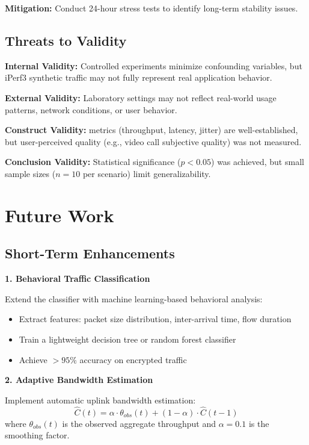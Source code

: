 \textbf{Mitigation:} Conduct 24-hour stress tests to identify long-term stability issues.

\subsection{Threats to Validity}

\textbf{Internal Validity:} Controlled experiments minimize confounding variables, but iPerf3 synthetic traffic may not fully represent real application behavior.

\textbf{External Validity:} Laboratory settings may not reflect real-world usage patterns, network conditions, or user behavior.

\textbf{Construct Validity:} \qos metrics (throughput, latency, jitter) are well-established, but user-perceived quality (e.g., video call subjective quality) was not measured.

\textbf{Conclusion Validity:} Statistical significance ($p < 0.05$) was achieved, but small sample sizes ($n=10$ per scenario) limit generalizability.

\section{Future Work}
\label{sec:future-work}

\subsection{Short-Term Enhancements}

\textbf{1. Behavioral Traffic Classification}

Extend the classifier with machine learning-based behavioral analysis:
\begin{itemize}
    \item Extract features: packet size distribution, inter-arrival time, flow duration
    \item Train a lightweight decision tree or random forest classifier
    \item Achieve $>95\%$ accuracy on encrypted traffic
\end{itemize}

\textbf{2. Adaptive Bandwidth Estimation}

Implement automatic uplink bandwidth estimation:
\begin{equation}
\hat{C}(t) = \alpha \cdot \theta_{obs}(t) + (1 - \alpha) \cdot \hat{C}(t-1)
\end{equation}
where $\theta_{obs}(t)$ is the observed aggregate throughput and $\alpha = 0.1$ is the smoothing factor.

